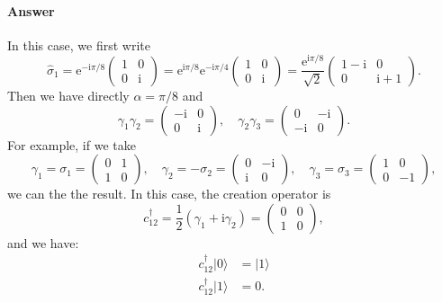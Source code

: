 \documentclass{book}
\begin{document}
\paragraph{Answer}
In this case, we first write
\begin{equation*}
\hat{\sigma }_{1} =\mathrm{e}^{-\mathrm{i} \pi /8}\begin{pmatrix}
1 & 0\\
0 & \mathrm{i}
\end{pmatrix} =\mathrm{e}^{\mathrm{i} \pi /8}\mathrm{e}^{-\mathrm{i} \pi /4}\begin{pmatrix}
1 & 0\\
0 & \mathrm{i}
\end{pmatrix} =\frac{\mathrm{e}^{\mathrm{i} \pi /8}}{\sqrt{2}}\begin{pmatrix}
1-\mathrm{i} & 0\\
0 & \mathrm{i} +1
\end{pmatrix} .
\end{equation*}
Then we have directly $\alpha =\pi /8$ and
\begin{equation*}
\gamma _{1} \gamma _{2} =\begin{pmatrix}
-\mathrm{i} & 0\\
0 & \mathrm{i}
\end{pmatrix} ,\quad \gamma _{2} \gamma _{3} =\begin{pmatrix}
0 & -\mathrm{i}\\
-\mathrm{i} & 0
\end{pmatrix} .
\end{equation*}
For example, if we take
\begin{equation*}
\gamma _{1} =\sigma _{1} =\begin{pmatrix}
0 & 1\\
1 & 0
\end{pmatrix} ,\quad \gamma _{2} =-\sigma _{2} =\begin{pmatrix}
0 & -\mathrm{i}\\
\mathrm{i} & 0
\end{pmatrix} ,\quad \gamma _{3} =\sigma _{3} =\begin{pmatrix}
1 & 0\\
0 & -1
\end{pmatrix} ,
\end{equation*}
we can the the result. In this case, the creation operator is
\begin{equation*}
c_{12}^{\dagger } =\frac{1}{2}( \gamma _{1} +\mathrm{i} \gamma _{2}) =\begin{pmatrix}
0 & 0\\
1 & 0
\end{pmatrix} ,
\end{equation*}
and we have:
\begin{equation*}
\begin{aligned}
c_{12}^{\dagger } |0 \rangle  & =|1 \rangle \\
c_{12}^{\dagger } |1 \rangle  & =0.
\end{aligned}
\end{equation*}
\end{document}
